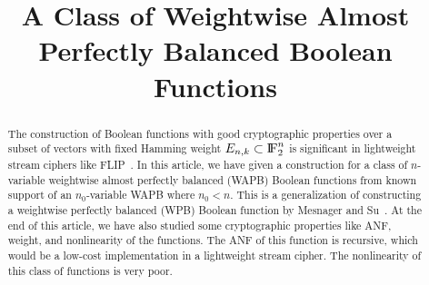 \documentclass{article}[12pt]
\title{A Class of Weightwise Almost Perfectly Balanced Boolean Functions}
\author{}
\date{}
\newcommand{\FF}{{\rm I\!F}}
\begin{document}
\maketitle

\begin{abstract}
	The construction of Boolean functions with good cryptographic properties over a subset of vectors with fixed Hamming weight $E_{n,k} \subset \FF_2^n$ is significant in lightweight stream ciphers like FLIP~\cite{MJSC16}. In this article, we have given a construction for a class of $n$-variable weightwise almost perfectly balanced (WAPB) Boolean functions from known support of an $n_0$-variable WAPB where $n_0 < n$. This is a generalization of constructing a weightwise perfectly balanced (WPB) Boolean function by Mesnager and Su~\cite{MS21}. At the end of this article, we have also studied some cryptographic properties like ANF, weight, and nonlinearity of the functions.  The ANF of this function is recursive, which would be a low-cost implementation in a lightweight stream cipher. The nonlinearity of this class of functions is very poor.
\end{abstract}
\end{document}

